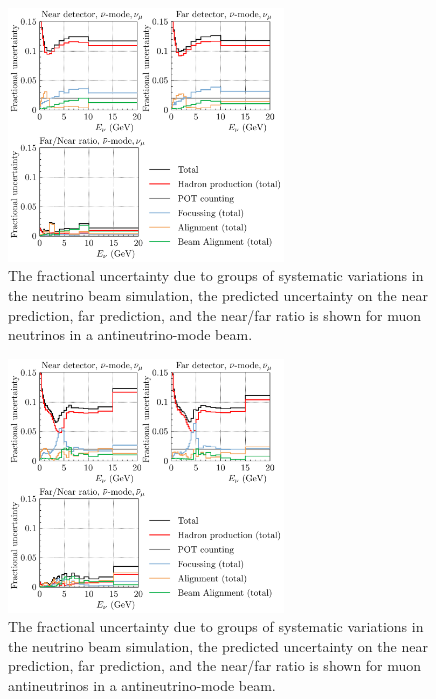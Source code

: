 \documentclass{article}
\begin{document}
\begin{figure}
  \centering
  \includegraphics[width=0.65\textwidth]{plots/fracerrs/nubarmode_numu_ErrType}
  \caption{The fractional uncertainty due to groups of systematic variations in the neutrino beam simulation, the predicted uncertainty on the near prediction, far prediction, and the near/far ratio is shown for muon neutrinos in a antineutrino-mode beam.}
  \label{fig:grp_nubar_numu}
\end{figure}

\begin{figure}
  \centering
  \includegraphics[width=0.65\textwidth]{plots/fracerrs/nubarmode_numubar_ErrType}
  \caption{The fractional uncertainty due to groups of systematic variations in the neutrino beam simulation, the predicted uncertainty on the near prediction, far prediction, and the near/far ratio is shown for muon antineutrinos in a antineutrino-mode beam.}
  \label{fig:grp_nubar_numubar}
\end{figure}
\end{document}
